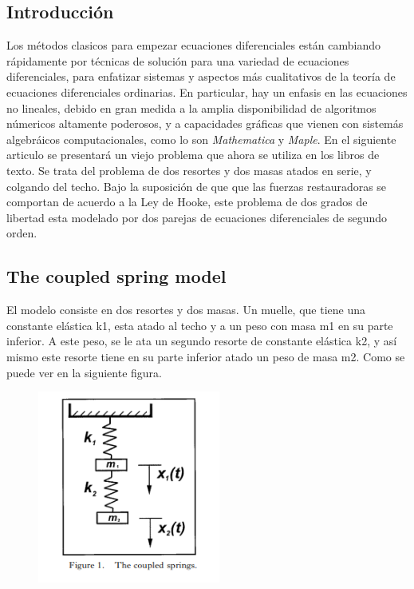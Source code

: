 \documentclass{article}
\begin{document}
\subsection{Introducción}
Los métodos clasicos para empezar ecuaciones diferenciales están cambiando rápidamente por técnicas de solución para una variedad de ecuaciones diferenciales, para enfatizar sistemas y aspectos más cualitativos de la teoría de ecuaciones diferenciales ordinarias. En particular, hay un enfasis en las ecuaciones no lineales, debido en gran medida a la amplia disponibilidad de algoritmos númericos altamente poderosos, y a capacidades gráficas que vienen con sistemás algebráicos computacionales, como lo son \textit{Mathematica} y \textit{Maple}.
En el siguiente articulo se presentará un viejo problema que ahora se utiliza en los libros de texto. Se trata del problema de dos resortes y dos masas atados en serie, y colgando del techo. Bajo la suposición de que que las fuerzas restauradoras se comportan de acuerdo a la Ley de Hooke, este problema de dos grados de libertad esta modelado por dos parejas de ecuaciones diferenciales de segundo orden.

\subsection{The coupled spring model}
El modelo consiste en dos resortes y dos masas. Un muelle, que tiene una constante elástica k1, esta atado al techo y a un peso con masa m1 en su parte inferior.
A este peso, se le ata un segundo resorte de constante elástica k2, y así mismo este resorte tiene en su parte inferior atado un peso de masa m2. Como se puede ver en la siguiente figura.

\begin{figure}[htb]
    \begin{center}
    \includegraphics[width=6cm]{Figura1.PNG}
    \end{center}
\end{figure}
\end{document}
